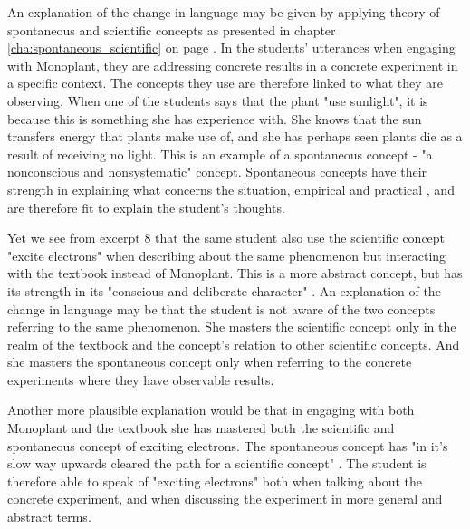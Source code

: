An explanation of the change in language may be given by applying \citet{vygotsky2012thought} theory of spontaneous and scientific concepts as presented in chapter \ref{cha:spontaneous_scientific} on page \pageref{cha:spontaneous_scientific}. In the students' utterances when engaging with Monoplant, they are addressing concrete results in a concrete experiment in a specific context. The concepts they use are therefore linked to what they are observing. When one of the students says that the plant "use sunlight", it is because this is something she has experience with. She knows that the sun transfers energy that plants make use of, and she has perhaps seen plants die as a result of receiving no light. This is an example of a spontaneous concept \citep{vygotsky2012thought} - "a nonconscious and nonsystematic" concept. Spontaneous concepts have their strength in explaining what concerns the situation, empirical and practical \citep{vygotsky2012thought}, and are therefore fit to explain the student's thoughts. 


Yet we see from excerpt 8 that the same student also use the scientific concept "excite electrons" when describing about the same phenomenon but interacting with the textbook instead of Monoplant. This is a more abstract concept, but has its strength in its "conscious and deliberate character" \citep{vygotsky2012thought}. An explanation of the change in language may be that the student is not aware of the two concepts referring to the same phenomenon. She masters the scientific concept only in the realm of the textbook and the concept's relation to other scientific concepts. And she masters the spontaneous concept only when referring to the concrete experiments where they have observable results. 

Another more plausible explanation would be that in engaging with both Monoplant and the textbook she has mastered both the scientific and spontaneous concept of exciting electrons. The spontaneous concept has "in it's slow way upwards cleared the path for a scientific concept" \citep{vygotsky2012thought}. The student is therefore able to speak of "exciting electrons" both when talking about the concrete experiment, and when discussing the experiment in more general and abstract terms. 

